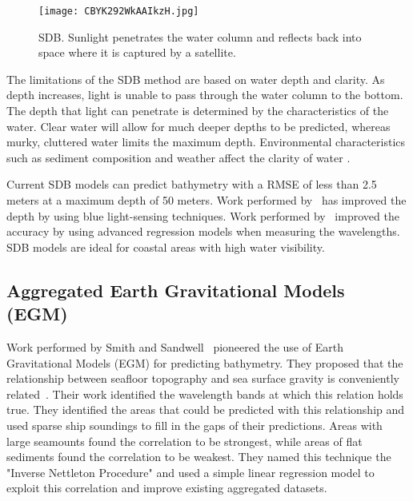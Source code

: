 \begin{figure}[htp]
    \centering
    \texttt{[image: CBYK292WkAAIkzH.jpg]}
    \caption{\ac{SDB}.
    Sunlight penetrates the water column and reflects back into space where it is captured by a satellite.}
    \label{fig:sdb}
\end{figure}

\par
The limitations of the \ac{SDB} method are based on water depth and clarity.
As depth increases, light is unable to pass through the water column to the bottom.
The depth that light can penetrate is determined by the characteristics of the water.
Clear water will allow for much deeper depths to be predicted, whereas murky, cluttered water limits the maximum depth.
Environmental characteristics such as sediment composition and weather affect the clarity of water \cite{vinayaraj2016satellite}.

\par
Current \ac{SDB} models can predict bathymetry with a \ac{RMSE} of less than 2.5 meters at a maximum depth of 50 meters.
Work performed by~\cite{vinayaraj2016satellite} has improved the depth by using blue light-sensing techniques.
Work performed by~\cite{chybicki2018three} improved the accuracy by using advanced regression models when measuring the wavelengths.
\ac{SDB} models are ideal for coastal areas with high water visibility.

\subsection{Aggregated Earth Gravitational Models (EGM)}
Work performed by Smith and Sandwell~\cite{smith1994bathymetric,smith1997global} pioneered the use of Earth Gravitational Models (EGM) for predicting bathymetry.
They proposed that the relationship between seafloor topography and sea surface gravity is conveniently related~\cite{smith1994bathymetric}.
Their work identified the wavelength bands at which this relation holds true.
They identified the areas that could be predicted with this relationship and used sparse ship soundings to fill in the gaps of their predictions.
Areas with large seamounts found the correlation to be strongest, while areas of flat sediments found the correlation to be weakest.
They named this technique the "Inverse Nettleton Procedure" and used a simple linear regression model to exploit this correlation and improve existing aggregated datasets.

